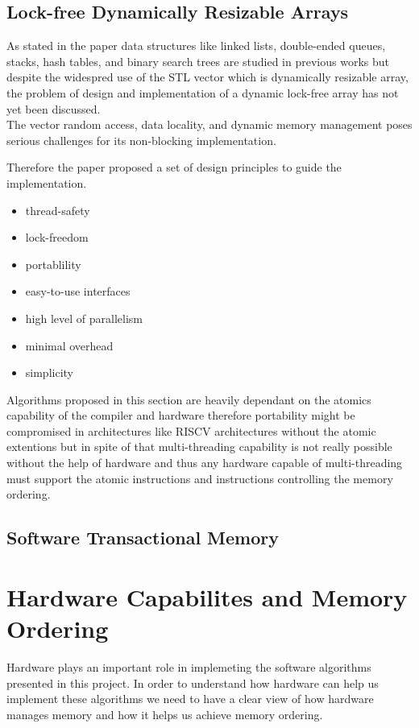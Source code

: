 \documentclass[a4paper, 11pt]{article}
\theoremstyle{nonumberplain}
\begin{document}
\subsection{Lock-free Dynamically Resizable Arrays}
As stated in the paper data structures like linked lists, double-ended queues,
stacks, hash tables, and binary search trees are studied in previous works but
despite the widespred use of the STL vector which is dynamically resizable
array, the problem of design and implementation of a dynamic lock-free array
has not yet been discussed. \\
The vector random access, data locality, and dynamic memory management poses
serious challenges for its non-blocking implementation.

\pagebreak

Therefore the paper proposed a set of design principles to guide the
implementation.
\begin{itemize}
    \item thread-safety
    \item lock-freedom
    \item portablility
    \item easy-to-use interfaces
    \item high level of parallelism
    \item minimal overhead
    \item simplicity
\end{itemize}
Algorithms proposed in this section are heavily dependant on the atomics
capability of the compiler and hardware therefore portability might be
compromised in architectures like RISCV architectures without the atomic
extentions but in spite of that multi-threading capability is not really
possible without the help of hardware and thus any hardware capable of
multi-threading must support the atomic instructions and instructions
controlling the memory ordering.

\subsection{Software Transactional Memory}

\section{Hardware Capabilites and Memory Ordering}
Hardware plays an important role in implemeting the software algorithms
presented in this project. In order to understand how hardware can help us
implement these algorithms we need to have a clear view of how hardware
manages memory and how it helps us achieve memory ordering.
\end{document}
